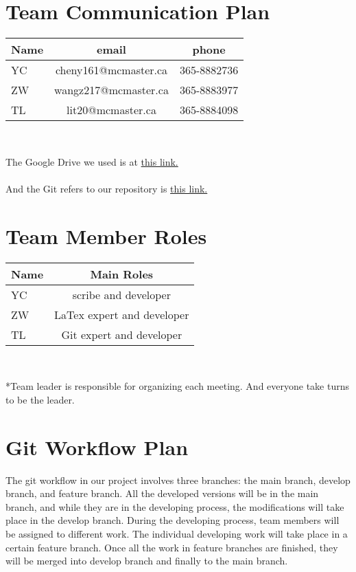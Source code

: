 \documentclass{article}
\begin{document}
\section{Team Communication Plan}
\begin{table}[H]
  \begin{center}
    \label{tab:table2}
    \begin{tabular}{|l|c|c|} 
    	\hline
      \textbf{Name} & \textbf{email} & \textbf{phone} \\
      \hline
      YC & cheny161@mcmaster.ca & 365-8882736 \\\hline
      ZW & wangz217@mcmaster.ca & 365-8883977 \\\hline
      TL & lit20@mcmaster.ca & 365-8884098  \\\hline
    \end{tabular}\\
  \end{center}
\end{table}
    The Google Drive we used is at \href{https://drive.google.com/drive/folders/1OPHTCanKQ8rV73WSYIb66rQAOSSac0Gg?usp=sharing}{this link.} \\\\And the Git refers to our repository is \href{https://gitlab.cas.mcmaster.ca/3XA3_Cloud10/se3xa3.git}{this link.}


\section{Team Member Roles}
\begin{table}[H]
  \begin{center}
    \label{tab:table2}
    \begin{tabular}{|l|c|} 
    	\hline
      \textbf{Name} & \textbf{Main Roles} \\
      \hline
      YC & scribe and developer \\\hline
      ZW & LaTex expert and developer \\\hline
      TL & Git expert and developer  \\\hline
    \end{tabular}\\
  \end{center}
\end{table}
*Team leader is responsible for organizing each meeting. And everyone take turns to be the leader.


\section{Git Workflow Plan}
The git workflow in our project involves three branches: the main branch, develop branch, and feature branch. All the developed versions will be in the main branch, and while they are in the developing process, the modifications will take place in the develop branch. During the developing process, team members will be assigned to different work. The individual developing work will take place in a certain feature branch. Once all the work in feature branches are finished, they will be merged into develop branch and finally to the main branch.
\end{document}
